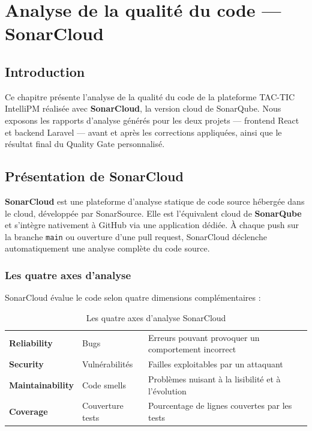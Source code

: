 \chapter{Analyse de la qualité du code — SonarCloud}

\section*{Introduction}
\begin{chapintro}
Ce chapitre présente l'analyse de la qualité du code de la plateforme TAC-TIC IntelliPM
réalisée avec \textbf{SonarCloud}, la version cloud de SonarQube. Nous exposons les
rapports d'analyse générés pour les deux projets — frontend React et backend Laravel —
avant et après les corrections appliquées, ainsi que le résultat final du Quality Gate
personnalisé.
\end{chapintro}

\section{Présentation de SonarCloud}

\textbf{SonarCloud} est une plateforme d'analyse statique de code source hébergée dans
le cloud, développée par SonarSource. Elle est l'équivalent cloud de \textbf{SonarQube}
et s'intègre nativement à GitHub via une application dédiée. À chaque push sur la
branche \texttt{main} ou ouverture d'une pull request, SonarCloud déclenche
automatiquement une analyse complète du code source.

\subsection{Les quatre axes d'analyse}

SonarCloud évalue le code selon quatre dimensions complémentaires :

\begin{table}[H]
  \centering
  \caption{Les quatre axes d'analyse SonarCloud}
  \label{tab:sonar_axes}
  \begin{tabularx}{\textwidth}{L{3.5cm}L{3cm}X}
    \toprule
     &  &  \\
    \midrule
    \textbf{Reliability}     & Bugs            & Erreurs pouvant provoquer un comportement incorrect \\
    \textbf{Security}        & Vulnérabilités  & Failles exploitables par un attaquant \\
    \textbf{Maintainability} & Code smells     & Problèmes nuisant à la lisibilité et à l'évolution \\
    \textbf{Coverage}        & Couverture tests & Pourcentage de lignes couvertes par les tests \\
    \bottomrule
  \end{tabularx}
\end{table}

